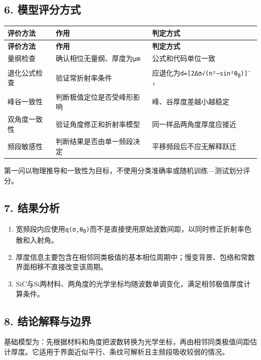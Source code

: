 \documentclass[11pt,a4paper]{ctexart}
\begin{document}
\subsection*{6. 模型评分方式}
\begin{center}
\scriptsize
\begin{longtable}{|>{\raggedright\arraybackslash}p{}|>{\raggedright\arraybackslash}p{}|>{\raggedright\arraybackslash}p{}|}
\hline
\textbf{评价方法} & \textbf{作用} & \textbf{判定方式} \\ \hline
\endfirsthead
\hline \textbf{评价方法} & \textbf{作用} & \textbf{判定方式} \\ \hline
\endhead
量纲检查 & 确认相位无量纲、厚度为\texttt{μm} & 公式和代码单位一致 \\ \hline
退化公式检查 & 验证常折射率条件 & 应退化为\texttt{d=[2Δσ√(n²−sin²θ\textsubscript{0})]\textsuperscript{-}¹} \\ \hline
峰谷一致性 & 判断极值定位是否受峰形影响 & 峰、谷厚度差越小越稳定 \\ \hline
双角度一致性 & 验证角度修正和折射率模型 & 同一样品两角度厚度应接近 \\ \hline
频段敏感性 & 判断结果是否由单一频段决定 & 平移频段后不应无解释跃迁 \\ \hline
\end{longtable}
\normalsize
\end{center}
第一问以物理推导和一致性为目标，不使用分类准确率或随机训练—测试划分评分。


\subsection*{7. 结果分析}
\begin{enumerate}
\item 宽频段内应使用\texttt{q(σ,θ\textsubscript{0})}而不是直接使用原始波数间距，以同时修正折射率色散和入射角。
\item 厚度信息主要包含在相邻同类极值的基本相位周期中；慢变背景、包络和常数界面相移不直接改变该周期。
\item SiC与Si两材料、两角度的光学坐标均随波数单调变化，满足相邻极值厚度计算条件。
\end{enumerate}
\subsection*{8. 结论解释与边界}
基础模型为：先根据材料和角度把波数转换为光学坐标，再由相邻同类极值间距估计厚度。它适用于界面近似平行、条纹可解析且主频段吸收较弱的情况。
\end{document}
